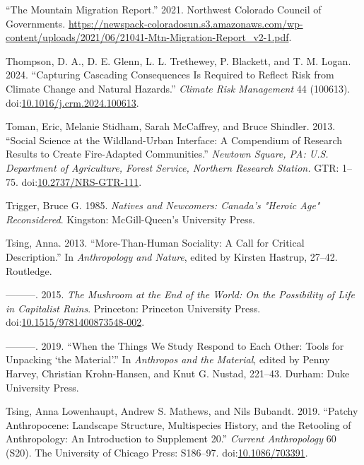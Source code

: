 \documentclass[
]{article}
\newlength{\cslhangindent}
\newenvironment{CSLReferences}[2] %
 {\begin{list}{}{%
  \setlength{\itemindent}{0pt}
  \setlength{\leftmargin}{0pt}
  \setlength{\parsep}{0pt}
  \ifodd #1
   \setlength{\leftmargin}{\cslhangindent}
   \setlength{\itemindent}{-1\cslhangindent}
  \fi
  \setlength{\itemsep}{#2\baselineskip}}}
 {\end{list}}
\begin{document}
\begin{CSLReferences}{1}{0}
{``The {Mountain Migration Report}.''} 2021. Northwest Colorado Council of Governments. \url{https://newspack-coloradosun.s3.amazonaws.com/wp-content/uploads/2021/06/21041-Mtn-Migration-Report_v2-1.pdf}.

Thompson, D. A., D. E. Glenn, L. L. Trethewey, P. Blackett, and T. M. Logan. 2024. {``Capturing Cascading Consequences Is Required to Reflect Risk from Climate Change and Natural Hazards.''} \emph{Climate Risk Management} 44 (100613). doi:\href{https://doi.org/10.1016/j.crm.2024.100613}{10.1016/j.crm.2024.100613}.

Toman, Eric, Melanie Stidham, Sarah McCaffrey, and Bruce Shindler. 2013. {``Social Science at the Wildland-Urban Interface: A Compendium of Research Results to Create Fire-Adapted Communities.''} \emph{Newtown Square, PA: U.S. Department of Agriculture, Forest Service, Northern Research Station.} GTR: 1--75. doi:\href{https://doi.org/10.2737/NRS-GTR-111}{10.2737/NRS-GTR-111}.

Trigger, Bruce G. 1985. \emph{Natives and Newcomers: {Canada}'s "{Heroic Age}" Reconsidered}. Kingston: McGill-Queen's University Press.

Tsing, Anna. 2013. {``More-Than-{Human Sociality}: {A Call} for {Critical Description}.''} In \emph{Anthropology and {Nature}}, edited by Kirsten Hastrup, 27--42. Routledge.

---------. 2015. \emph{The {Mushroom} at the {End} of the {World}: {On} the {Possibility} of {Life} in {Capitalist Ruins}}. Princeton: Princeton University Press. doi:\href{https://doi.org/10.1515/9781400873548-002}{10.1515/9781400873548-002}.

---------. 2019. {``When the {Things We Study Respond} to {Each Other}: {Tools} for {Unpacking} {`the {Material}'}.''} In \emph{Anthropos and the {Material}}, edited by Penny Harvey, Christian Krohn-Hansen, and Knut G. Nustad, 221--43. Durham: Duke University Press.

Tsing, Anna Lowenhaupt, Andrew S. Mathews, and Nils Bubandt. 2019. {``Patchy {Anthropocene}: {Landscape Structure}, {Multispecies History}, and the {Retooling} of {Anthropology}: {An Introduction} to {Supplement} 20.''} \emph{Current Anthropology} 60 (S20). The University of Chicago Press: S186--97. doi:\href{https://doi.org/10.1086/703391}{10.1086/703391}.


\end{CSLReferences}
\end{document}
